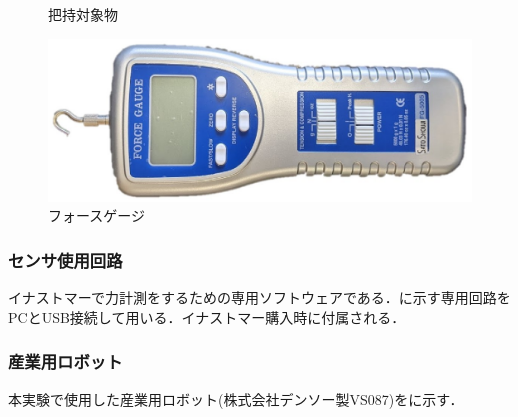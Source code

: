 \begin{figure}[h]
\hspace{7mm}
\hspace{7mm}
\caption{把持対象物}
\label{fig::obj}
\end{figure}

\begin{figure}[h]
 \begin{center}
  \includegraphics[scale=0.4]{../fig/eps/force_gauge.eps}
 \caption{フォースゲージ}
  \label{fig::force_gauge}
 \end{center}
\end{figure}
\newpage

\subsubsection{センサ使用回路}
イナストマーで力計測をするための専用ソフトウェアである．に示す専用回路をPCとUSB接続して用いる．イナストマー購入時に付属される．


\subsubsection{産業用ロボット}
本実験で使用した産業用ロボット(株式会社デンソー製VS087)をに示す．


